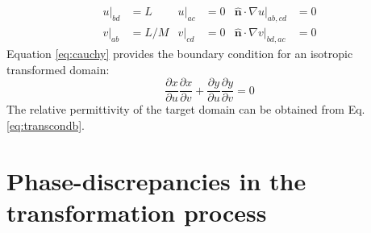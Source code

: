 \begin{subequations} \label{eq:bc}
\begin{align}
u|_{bd}  &= L   &  u|_{ac} &= 0 &  \hat{\mathbf{n}} \cdot \nabla u|_{ab,cd}  &= 0 \label{eq:bc1} \\
v|_{ab}  &= L/M &  v|_{cd} &= 0 &  \hat{\mathbf{n}} \cdot \nabla v|_{bd,ac}  &= 0 \label{eq:bc2}
\end{align}
\end{subequations}
%
Equation \ref{eq:cauchy} provides the boundary condition for an isotropic transformed domain:
 \begin{equation}
 \dfrac{\partial x}{\partial u} \dfrac{\partial x}{\partial v} + \dfrac{\partial y}{\partial u} \dfrac{\partial y}{\partial v} = 0
 \end{equation} 
The relative permittivity of the target domain can be obtained from Eq. \ref{eq:transcondb}.


%


\section{Phase-discrepancies in the transformation process} \label{sec:discrepancies}

